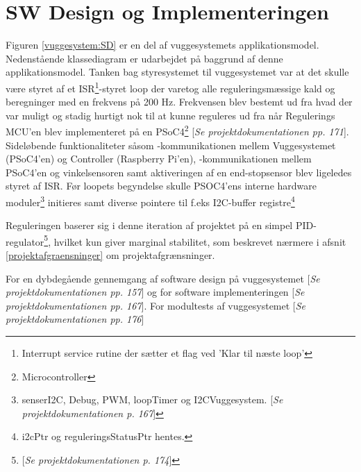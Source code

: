 \section{SW Design og Implementeringen}
\label{vs_sw}
Figuren \ref{vuggesystem:SD} er en del af vuggesystemets applikationsmodel. Nedenstående klassediagram er udarbejdet på baggrund af denne applikationsmodel.
Tanken bag styresystemet til vuggesystemet var at det skulle være styret af et ISR\footnote{Interrupt service rutine der sætter et flag ved 'Klar til næste loop'}-styret loop der varetog alle reguleringsmæssige kald og beregninger med en frekvens på 200 Hz. Frekvensen blev bestemt ud fra hvad der var muligt og stadig hurtigt nok til at kunne reguleres ud fra når Regulerings MCU'en blev implementeret på en PSoC4\footnote{Microcontroller} [\textit{Se projektdokumentationen pp. 171}]. Sideløbende funktionaliteter såsom \iic-kommunikationen mellem Vuggesystemet (PSoC4'en) og Controller (Raspberry Pi'en), \iic-kommunikationen mellem PSoC4'en og vinkelsensoren samt aktiveringen af en end-stopsensor blev ligeledes styret af ISR. Før loopets begyndelse skulle PSOC4'ens interne hardware moduler\footnote{senserI2C, Debug, PWM, loopTimer og I2CVuggesystem. [\textit{Se projektdokumentationen p. 167}]} initieres samt diverse pointere til f.eks I2C-buffer registre\footnote{i2cPtr og reguleringsStatusPtr hentes.}

Reguleringen baserer sig i denne iteration af projektet på en simpel PID-regulator\footnote{ [\textit{Se projektdokumentationen p. 174}]}, hvilket kun giver marginal stabilitet, som beskrevet nærmere i afsnit \vref{projektafgraensninger} om projektafgrænsninger.

For en dybdegående gennemgang af software design på vuggesystemet [\textit{Se projektdokumentationen pp. 157}] og for software implementeringen [\textit{Se projektdokumentationen pp. 167}]. For modultests af vuggesystemet [\textit{Se projektdokumentationen pp. 176}]

